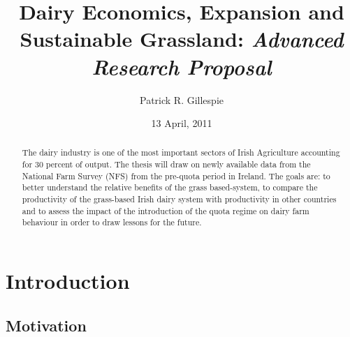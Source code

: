 \documentclass[12pt]{report}
\title{Dairy Economics, Expansion and Sustainable Grassland: \emph{Advanced Research Proposal}}
\author{Patrick R. Gillespie}
\date{13 April, 2011}
\begin{document}
\maketitle
\begin{abstract}
The dairy industry is one of the most important sectors of Irish Agriculture accounting for 30 percent of output. The thesis will draw on newly available data from the National Farm Survey (NFS) from the pre-quota period in Ireland. The goals are: to better understand the relative benefits of the grass based-system, to compare the productivity of the grass-based Irish dairy system with productivity in other countries and to assess the impact of the introduction of the quota regime on dairy farm behaviour in order to draw lessons for the future.
\end{abstract}


\chapter{Introduction}

\section{Motivation}


%
%
%
%
\end{document}
